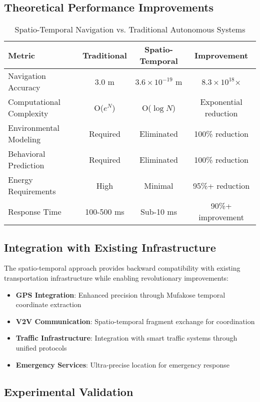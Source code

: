 \documentclass[12pt,a4paper]{article}
\begin{document}
\subsection{Theoretical Performance Improvements}

\begin{table}[h]
\centering
\caption{Spatio-Temporal Navigation vs. Traditional Autonomous Systems}
\begin{tabular}{lccc}
\toprule
\textbf{Metric} & \textbf{Traditional} & \textbf{Spatio-Temporal} & \textbf{Improvement} \\
\midrule
Navigation Accuracy & 3.0 m & $3.6 \times 10^{-19}$ m & $8.3 \times 10^{18}$× \\
Computational Complexity & O($e^N$) & O($\log N$) & Exponential reduction \\
Environmental Modeling & Required & Eliminated & 100\% reduction \\
Behavioral Prediction & Required & Eliminated & 100\% reduction \\
Energy Requirements & High & Minimal & 95\%+ reduction \\
Response Time & 100-500 ms & Sub-10 ms & 90\%+ improvement \\
\bottomrule
\end{tabular}
\label{tab:performance_comparison}
\end{table}

\subsection{Integration with Existing Infrastructure}

The spatio-temporal approach provides backward compatibility with existing transportation infrastructure while enabling revolutionary improvements:

\begin{itemize}
\item \textbf{GPS Integration}: Enhanced precision through Mufakose temporal coordinate extraction
\item \textbf{V2V Communication}: Spatio-temporal fragment exchange for coordination
\item \textbf{Traffic Infrastructure}: Integration with smart traffic systems through unified protocols
\item \textbf{Emergency Services}: Ultra-precise location for emergency response
\end{itemize}

\subsection{Experimental Validation}
\end{document}
